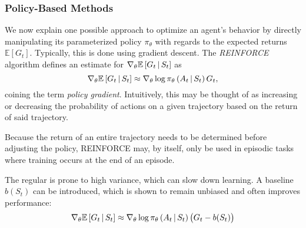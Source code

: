 \subsubsection{Policy-Based Methods}
We now explain one possible approach to optimize an agent's behavior by directly manipulating its parameterized policy $\pi_\theta$ with regards to the expected returns $\mathbb{E}\left[G_t\right]$. Typically, this is done using gradient descent. The \textit{REINFORCE} algorithm \cite{reinforce} defines an estimate for $\nabla_\theta \mathbb{E}\left[G_t \,\middle|\, S_t \right]$ as
\begin{equation*}
    \nabla_\theta \mathbb{E}\left[G_t \,\middle|\, S_t \right] \approx \nabla_\theta \log \pi_\theta\left(A_t \,\middle|\, S_t\right) G_t,
\end{equation*}
coining the term \textit{policy gradient}. Intuitively, this may be thought of as increasing or decreasing the probability of actions on a given trajectory based on the return of said trajectory.

Because the return of an entire trajectory needs to be determined before adjusting the policy, REINFORCE may, by itself, only be used in episodic tasks where training occurs at the end of an episode.

The regular is prone to high variance, which can slow down learning. A baseline $b(S_t)$ can be introduced, which is shown to remain unbiased and often improves performance:
\begin{equation*}
    \nabla_\theta \mathbb{E}\left[G_t \,\middle|\, S_t \right] \approx \nabla_\theta \log \pi_\theta\left(A_t \,\middle|\, S_t\right) \left(G_t - b(S_t)\right)
\end{equation*}